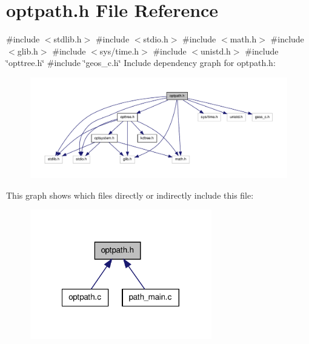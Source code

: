 \hypertarget{a00016}{\section{optpath.\-h \-File \-Reference}
\label{d7/d7a/a00016}
}
{\ttfamily \#include $<$stdlib.\-h$>$}\*
{\ttfamily \#include $<$stdio.\-h$>$}\*
{\ttfamily \#include $<$math.\-h$>$}\*
{\ttfamily \#include $<$glib.\-h$>$}\*
{\ttfamily \#include $<$sys/time.\-h$>$}\*
{\ttfamily \#include $<$unistd.\-h$>$}\*
{\ttfamily \#include \char`\"{}opttree.\-h\char`\"{}}\*
{\ttfamily \#include \char`\"{}geos\-\_\-c.\-h\char`\"{}}\*
\-Include dependency graph for optpath.\-h\-:\nopagebreak
\begin{figure}[H]
\begin{center}
\leavevmode
\includegraphics[width=350pt]{d6/d5b/a00026}
\end{center}
\end{figure}
\-This graph shows which files directly or indirectly include this file\-:\nopagebreak
\begin{figure}[H]
\begin{center}
\leavevmode
\includegraphics[width=224pt]{d0/d33/a00027}
\end{center}
\end{figure}
